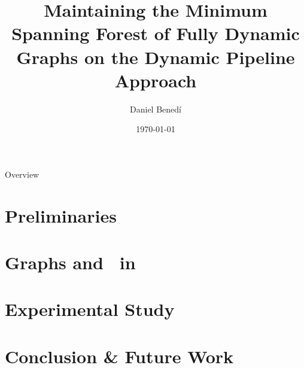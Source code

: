 \documentclass{beamer}
\title[Dyn. MST on Dynamic Pipeline] %
{Maintaining the Minimum Spanning Forest of Fully Dynamic Graphs on the Dynamic Pipeline Approach}
\author[D. Benedí] %
{Daniel Benedí}
\institute[UPC] %
{
  Facultat d'Informàtica de Barcelona\\
  Universitat Politècnica de Catalunya
}
\date[\monthyeardate\today] %
{\monthyeardate\today}
\begin{document}
\frame{\titlepage}

\begin{frame}{Overview}
    \tableofcontents
\end{frame}







\section{Preliminaries}


\section{Graphs and \msts\ in \dpm}


\section{Experimental Study}


\section{Conclusion \& Future Work}

\end{document}
